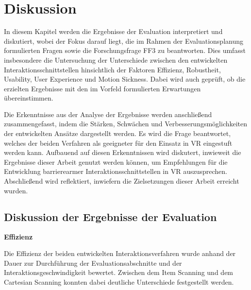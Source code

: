 \chapter{Diskussion}
\label{chap:Diskussion}

In diesem Kapitel werden die Ergebnisse der Evaluation interpretiert und diskutiert, wobei der Fokus darauf liegt, die im Rahmen der Evaluationsplanung formulierten Fragen sowie die Forschungsfrage FF3 zu beantworten. Dies umfasst insbesondere die Untersuchung der Unterschiede zwischen den entwickelten Interaktionsschnittstellen hinsichtlich der Faktoren Effizienz, Robustheit, Usability, User Experience und Motion Sickness. Dabei wird auch geprüft, ob die erzielten Ergebnisse mit den im Vorfeld formulierten Erwartungen übereinstimmen.

Die Erkenntnisse aus der Analyse der Ergebnisse werden anschließend zusammengefasst, indem die Stärken, Schwächen und Verbesserungsmöglichkeiten der entwickelten Ansätze dargestellt werden. Es wird die Frage beantwortet, welches der beiden Verfahren als geeigneter für den Einsatz in VR eingestuft werden kann. Aufbauend auf diesen Erkenntnissen wird diskutert, inwieweit die Ergebnisse dieser Arbeit genutzt werden können, um Empfehlungen für die Entwicklung barrierearmer Interaktionsschnittstellen in VR auszusprechen.
Abschließend wird reflektiert, inwiefern die Zielsetzungen dieser Arbeit erreicht wurden.

\section{Diskussion der Ergebnisse der Evaluation}

\textbf{Effizienz}

Die Effizienz der beiden entwickelten Interaktionsverfahren wurde anhand der Dauer zur Durchführung der Evaluationsabschnitte und der Interaktionsgeschwindigkeit bewertet. Zwischen dem Item Scanning und dem Cartesian Scanning konnten dabei deutliche Unterschiede festgestellt werden.

